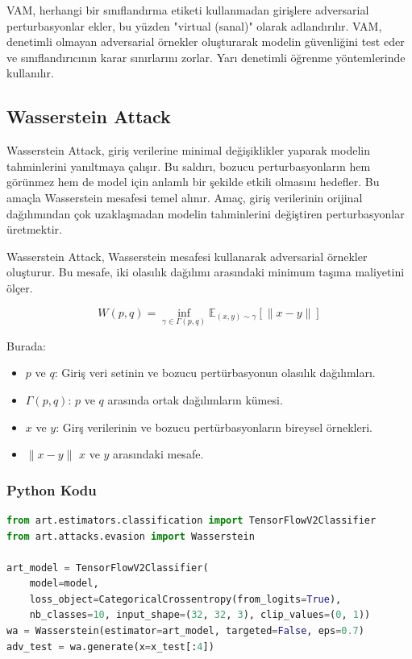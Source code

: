 VAM, herhangi bir sınıflandırma etiketi kullanmadan girişlere adversarial perturbasyonlar ekler, bu yüzden "virtual (sanal)" olarak adlandırılır. VAM, denetimli olmayan adversarial örnekler oluşturarak modelin güvenliğini test eder ve sınıflandırıcının karar sınırlarını zorlar. Yarı denetimli öğrenme yöntemlerinde kullanılır.

\newpage

\subsection{Wasserstein Attack}

Wasserstein Attack, giriş verilerine minimal değişiklikler yaparak modelin tahminlerini yanıltmaya çalışır. Bu saldırı, bozucu perturbasyonların hem görünmez hem de model için anlamlı bir şekilde etkili olmasını hedefler. Bu amaçla Wasserstein mesafesi temel alınır. Amaç, giriş verilerinin orijinal dağılımından çok uzaklaşmadan modelin tahminlerini değiştiren perturbasyonlar üretmektir.

Wasserstein Attack, Wasserstein mesafesi kullanarak adversarial örnekler oluşturur. Bu mesafe, iki olasılık dağılımı arasındaki minimum taşıma maliyetini ölçer.

\[ W(p, q) = \inf_{\gamma \in \Gamma(p, q)} \mathbb{E}_{(x, y) \sim \gamma}[\| x - y \|] \]

Burada:

\begin{itemize}
    \item $p$ ve $q$: Giriş veri setinin ve bozucu pertürbasyonun olasılık dağılımları.
    \item $\Gamma(p, q)$: $p$ ve $q$ arasında ortak dağılımların kümesi.
    \item $x$ ve $y$: Girş verilerinin ve bozucu pertürbasyonların bireysel örnekleri.
    \item $\| x - y \|$ $x$ ve $y$ arasındaki mesafe.
\end{itemize}

\subsubsection{Python Kodu}

\begin{lstlisting}[language=Python]
from art.estimators.classification import TensorFlowV2Classifier
from art.attacks.evasion import Wasserstein

art_model = TensorFlowV2Classifier(
    model=model,
    loss_object=CategoricalCrossentropy(from_logits=True), 
    nb_classes=10, input_shape=(32, 32, 3), clip_values=(0, 1))
wa = Wasserstein(estimator=art_model, targeted=False, eps=0.7)
adv_test = wa.generate(x=x_test[:4])
\end{lstlisting}

